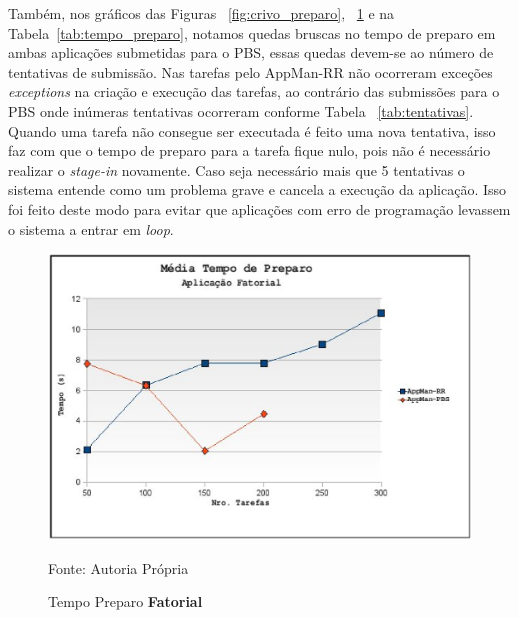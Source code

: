 Também, nos gráficos das Figuras ~\ref{fig:crivo_preparo}, ~\ref{fig:fatorial_preparo} e na Tabela~\ref{tab:tempo_preparo}, notamos quedas bruscas no tempo de preparo em ambas aplicações submetidas para o PBS, essas quedas devem-se ao número de tentativas de submissão. Nas tarefas pelo AppMan-RR não ocorreram exceções \emph{exceptions} na criação e execução das tarefas, ao contrário das submissões para o PBS onde inúmeras tentativas ocorreram conforme Tabela ~\ref{tab:tentativas}. Quando uma tarefa não consegue ser executada é feito uma nova tentativa, isso faz com que o tempo de preparo para a tarefa fique nulo, pois não é necessário realizar o \emph{stage-in} novamente. Caso seja necessário mais que 5 tentativas o sistema entende como um problema grave e cancela a execução da aplicação. Isso foi feito deste modo para evitar que aplicações com erro de programação levassem o sistema a entrar em \emph{loop}.

\begin{figure}[hbtp]
\begin{center}
\includegraphics[scale=0.7]{./img/PreparoFatorial.ps}
\caption{Tempo Preparo \textbf{Fatorial}}
\label{fig:fatorial_preparo}
Fonte: Autoria Própria
\end{center}
\end{figure}

